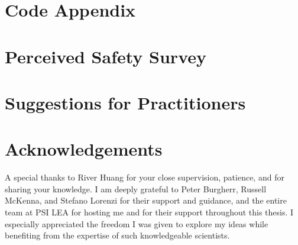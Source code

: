 \documentclass{polimi_template_classic/PoliMi3i_thesis}
\begin{document}

\cleardoublepage
{} %
\appendix
\chapter{Code Appendix}


\chapter{Perceived Safety Survey}


\chapter{Suggestions for Practitioners}


\printnoidxglossaries
\listoffigures

\listoftables


\chapter*{Acknowledgements}
A special thanks to River Huang for your close supervision, patience, and for sharing your knowledge. I am deeply grateful to Peter Burgherr, Russell McKenna, and Stefano Lorenzi for their support and guidance, and the entire team at PSI LEA for hosting me and for their support throughout this thesis. I especially appreciated the freedom I was given to explore my ideas while benefiting from the expertise of such knowledgeable scientists.
\end{document}
